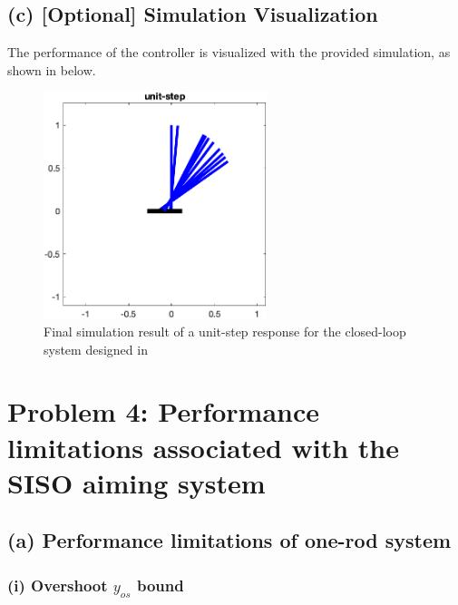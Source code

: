 \documentclass{tron}
\begin{document}

\subsection{(c) [Optional] Simulation Visualization \label{ans:P1-c}}
The performance of the controller is visualized with the provided simulation, as shown in  below.
\begin{figure}[H]
	\centering
	\includegraphics[height=250px]{../matlab/output/p3/sim_unit-step}
	\caption{Final simulation result of a unit-step response for the closed-loop system designed in }
	\label{fig:sim}
\end{figure}


\newpage
\section{Problem 4: Performance limitations associated with the SISO aiming system}

\subsection{(a) Performance limitations of one-rod system}
\subsubsection{(i) Overshoot $y_{os}$ bound \label{sec:4ai}}
\end{document}
